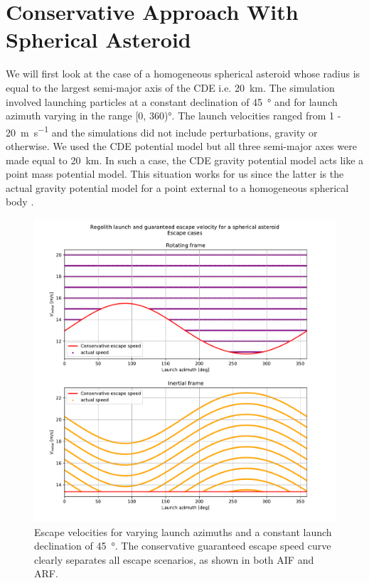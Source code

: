 \section{Conservative Approach With Spherical Asteroid}
\label{sec:conservative_spherical_asteroid_results}
We will first look at the case of a homogeneous spherical asteroid whose radius is equal to the largest semi-major axis of the \gls{CDE} i.e. \SI{20}{\kilo\metre}. The simulation involved launching particles at a constant declination of \SI{45}{\degree} and for launch azimuth varying in the range [0, 360)\si{\degree}. The launch velocities ranged from 1 - \SI{20}{\metre \per \second} and the simulations did not include perturbations, gravity or otherwise. We used the \gls{CDE} potential model but all three semi-major axes were made equal to \SI{20}{\kilo\metre}. In such a case, the \gls{CDE} gravity potential model acts like a point mass potential model. This situation works for us since the latter is the actual gravity potential model for a point external to a homogeneous spherical body \parencite{macmillanPotential}.
\begin{figure}[htb]
\centering
\captionsetup{justification=centering}
\includegraphics[width=\textwidth, height=0.7\textheight, keepaspectratio=true]{non_conservative_escape_speed/spherical_asteroid_conservative_escape_speed.pdf}
\caption{Escape velocities for varying launch azimuths and a constant launch declination of \protect\SI{45}{\degree}. The conservative guaranteed escape speed curve clearly separates all escape scenarios, as shown in both \protect\gls{AIF} and \protect\gls{ARF}.}
\label{fig:conservative_spherical_asteroid_escape}
\end{figure}

